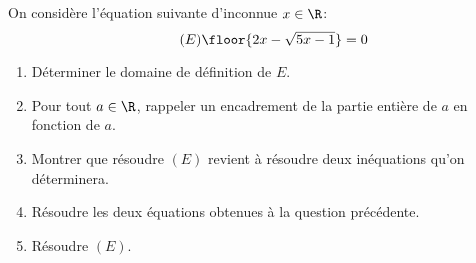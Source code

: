 




\vspace{0.5cm}
\begin{exercice}
On considère l'équation suivante d'inconnue $x\in \R$:
\begin{equation}\tag{$E$}
\floor{2x - \sqrt{5x-1}}=0
\end{equation}
\begin{enumerate}
\item Déterminer le domaine de définition de $E$.
\item  Pour tout $a\in \R$, rappeler un encadrement de la partie entière  de $a$ en fonction de $a$. 
\item Montrer que résoudre $(E)$ revient à résoudre deux inéquations qu'on déterminera. 
\item Résoudre les deux équations obtenues à la question précédente. 
\item Résoudre $(E)$. 
\end{enumerate}
\end{exercice}

